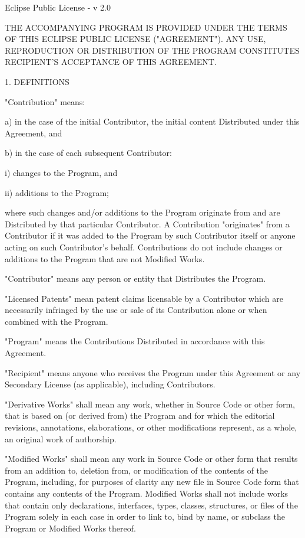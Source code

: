 
Eclipse Public License - v 2.0

THE ACCOMPANYING PROGRAM IS PROVIDED UNDER THE TERMS OF THIS ECLIPSE
PUBLIC LICENSE ("AGREEMENT"). ANY USE, REPRODUCTION OR DISTRIBUTION
OF THE PROGRAM CONSTITUTES RECIPIENT'S ACCEPTANCE OF THIS AGREEMENT.

1. DEFINITIONS

"Contribution" means:

a) in the case of the initial Contributor, the initial content
Distributed under this Agreement, and

b) in the case of each subsequent Contributor:

i) changes to the Program, and

ii) additions to the Program;

where such changes and/or additions to the Program originate from
and are Distributed by that particular Contributor. A Contribution
"originates" from a Contributor if it was added to the Program by
such Contributor itself or anyone acting on such Contributor's behalf.
Contributions do not include changes or additions to the Program that
are not Modified Works.

"Contributor" means any person or entity that Distributes the Program.

"Licensed Patents" mean patent claims licensable by a Contributor which
are necessarily infringed by the use or sale of its Contribution alone
or when combined with the Program.

"Program" means the Contributions Distributed in accordance with this
Agreement.

"Recipient" means anyone who receives the Program under this Agreement
or any Secondary License (as applicable), including Contributors.

"Derivative Works" shall mean any work, whether in Source Code or other
form, that is based on (or derived from) the Program and for which the
editorial revisions, annotations, elaborations, or other modifications
represent, as a whole, an original work of authorship.

"Modified Works" shall mean any work in Source Code or other form that
results from an addition to, deletion from, or modification of the
contents of the Program, including, for purposes of clarity any new file
in Source Code form that contains any contents of the Program. Modified
Works shall not include works that contain only declarations,
interfaces, types, classes, structures, or files of the Program solely
in each case in order to link to, bind by name, or subclass the Program
or Modified Works thereof.

